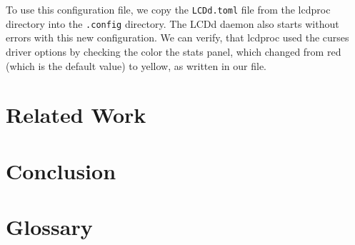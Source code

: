 \documentclass[12pt]{report}
\begin{document}
To use this configuration file, we copy the \texttt{LCDd.toml} file from the lcdproc directory into the \texttt{.config} directory.
The LCDd daemon also starts without errors with this new configuration.
We can verify, that lcdproc used the curses driver options by checking the color the stats panel, which changed from red (which is the default value) to yellow, as written in our file.
\chapter{Related Work}

\chapter{Conclusion}

\chapter{Glossary}

\printglossary[type=\acronymtype]

{}

\end{document}
